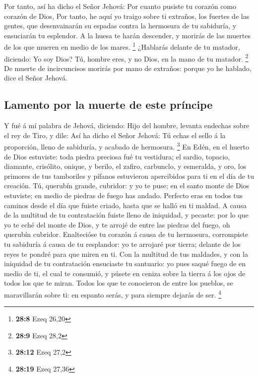  Por tanto, así ha dicho el Señor Jehová: Por cuanto pusiste
tu corazón como corazón de Dios,  Por tanto, he aquí yo
traigo sobre ti extraños, los fuertes de las gentes, que desenvainarán
su espadas contra la hermosura de tu sabiduría, y ensuciarán tu
esplendor.  A la huesa te harán descender, y morirás de las
muertes de los que mueren en medio de los mares. \footnote{\textbf{28:8}
  Ezeq 26,20}  ¿Hablarás delante de tu matador, diciendo: Yo
soy Dios? Tú, hombre eres, y no Dios, en la mano de tu matador.
\footnote{\textbf{28:9} Ezeq 28,2}  De muerte de
incircuncisos morirás por mano de extraños: porque yo he hablado, dice
el Señor Jehová.

\hypertarget{lamento-por-la-muerte-de-este-pruxedncipe}{%
\subsection{Lamento por la muerte de este
príncipe}\label{lamento-por-la-muerte-de-este-pruxedncipe}}

 Y fué á mí palabra de Jehová, diciendo:  Hijo
del hombre, levanta endechas sobre el rey de Tiro, y dile: Así ha dicho
el Señor Jehová: Tú echas el sello á la proporción, lleno de sabiduría,
y acabado de hermosura. \footnote{\textbf{28:12} Ezeq 27,2}
 En Edén, en el huerto de Dios estuviste: toda piedra
preciosa fué tu vestidura; el sardio, topacio, diamante, crisólito,
onique, y berilo, el zafiro, carbunclo, y esmeralda, y oro, los primores
de tus tamboriles y pífanos estuvieron apercibidos para ti en el día de
tu creación.  Tú, querubín grande, cubridor: y yo te puse;
en el santo monte de Dios estuviste; en medio de piedras de fuego has
andado.  Perfecto eras en todos tus caminos desde el día
que fuiste criado, hasta que se halló en ti maldad.  A
causa de la multitud de tu contratación fuiste lleno de iniquidad, y
pecaste: por lo que yo te eché del monte de Dios, y te arrojé de entre
las piedras del fuego, oh querubín cubridor.  Enaltecióse
tu corazón á causa de tu hermosura, corrompiste tu sabiduría á causa de
tu resplandor: yo te arrojaré por tierra; delante de los reyes te pondré
para que miren en ti.  Con la multitud de tus maldades, y
con la iniquidad de tu contratación ensuciaste tu santuario: yo pues
saqué fuego de en medio de ti, el cual te consumió, y púsete en ceniza
sobre la tierra á los ojos de todos los que te miran. 
Todos los que te conocieron de entre los pueblos, se maravillarán sobre
ti: en espanto serás, y para siempre dejarás de ser. \footnote{\textbf{28:19}
  Ezeq 27,36}

